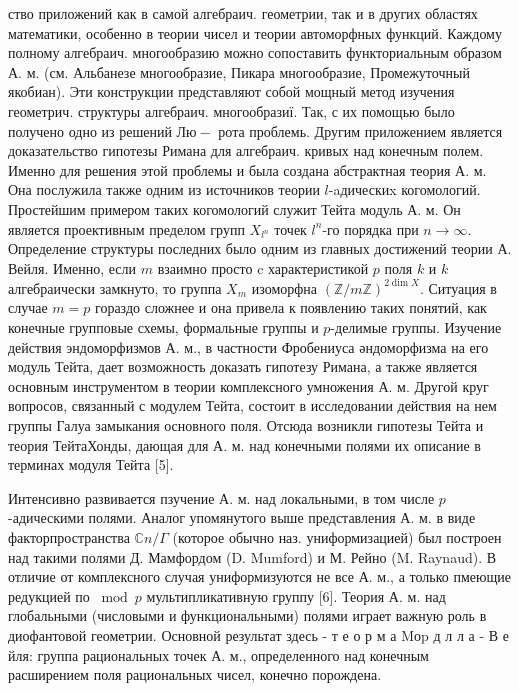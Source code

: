 \documentclass[10pt]{article}
\begin{document}
ство приложений как в самой алгебраич. геометрии, так и в других областях математики, особенно в теории чисел и теории автоморфных функций. Каждому полному алгебраич. многообразию можно сопоставить функториальным образом А. м. (см. Альбанезе многообразие, Пикара многообразие, Промежуточный якобиан). Эти конструкции представляют собой мощный метод изучения геометрич. структуры алгебраич. многообразиї. Так, с их помощью было получено одно из решений $Л ю-$ рота проблемь. Другим приложением является доказательство гипотезы Римана для алгебраич. кривых над конечным полем. Именно для решения этой проблемы и была создана абстрактная теория А. м. Она послужила также одним из источников теории $l$-aдическиx когомологий. Простейшим примером таких когомологий служит Тейта модуль А. м. Он является проективным пределом групп $X_{l^{n}}$ точек $l^{n}$-го порядка при $n \rightarrow \infty$. Определение структуры последних было одним из главных достижений теории А. Вейля. Именно, если $m$ взаимно просто $\mathrm{c}$ характеристикой $p$ поля $k$ и $k$ алгебраически замкнуто, то группа $X_{m}$ изоморфна $(\mathbb{Z} / m \mathbb{Z})^{2 \operatorname{dim} X}$. Ситуация в случае $m=p$ гораздо сложнее и она привела к появлению таких понятий, как конечные групповые схемы, формальные группы и $p$-делимые группы. Изучение действия эндоморфизмов А. м., в частности Фробениуса әндоморфизма на его модуль Тейта, дает возможность доказать гипотезу Римана, а также является основным инструментом в теории комплексного умножения А. м. Другой круг вопросов, связанный с модулем Тейта, состоит в исследовании действия на нем группы Галуа замыкания основного поля. Отсюда возникли гипотезы Тейта и теория ТейтаХонды, дающая для А. м. над конечными полями их описание в терминах модуля Тейта [5].



Интенсивно развивается пзучение А. м. над локальными, в том числе $p$-адическими полями. Аналог упомянутого выше представления А. м. в виде факторпространства $\mathbb{C} n / \Gamma$ (которое обычно наз. униформизацией) был построен над такими полями Д. Мамфордом (D. Mumford) и М. Рейно (M. Raynaud). В отличие от комплексного случая униформизуются не все А. м., а только пмеющие редукцией по $\bmod p$ мультипликативную группу [6]. Теория А. м. над глобальными (числовыми и функциональными) полями играет важную роль в диофантовой геометрии. Основной результат здесь - т е о р м а $\mathrm{M} о \mathrm{p}$ д л л а - В е йля: группа рациональных точек А. м., определенного над конечным расширением поля рациональных чисел, конечно порождена.
\end{document}
